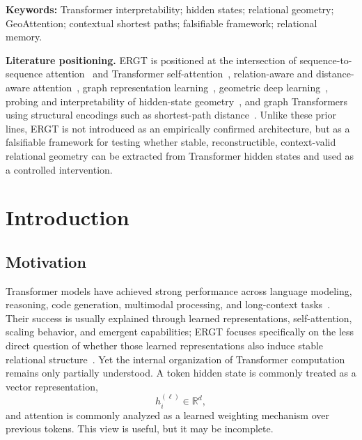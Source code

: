 \documentclass[11pt]{article}
\begin{document}
\noindent\textbf{Keywords:} Transformer interpretability; hidden states; relational geometry; GeoAttention; contextual shortest paths; falsifiable framework; relational memory.

\vspace{0.6em}
\noindent\textbf{Literature positioning.} ERGT is positioned at the intersection of sequence-to-sequence attention~\cite{bahdanau2015neural} and Transformer self-attention~\cite{vaswani2017attention}, relation-aware and distance-aware attention~\cite{shaw2018self,press2021train}, graph representation learning~\cite{scarselli2009graph,kipf2017semi,gilmer2017neural,velickovic2018graph}, geometric deep learning~\cite{bronstein2021geometric}, probing and interpretability of hidden-state geometry~\cite{hewitt2019structural,belinkov2019analysis}, and graph Transformers using structural encodings such as shortest-path distance~\cite{ying2021graphormer}. Unlike these prior lines, ERGT is not introduced as an empirically confirmed architecture, but as a falsifiable framework for testing whether stable, reconstructible, context-valid relational geometry can be extracted from Transformer hidden states and used as a controlled intervention.

\section{Introduction}

\subsection{Motivation}

Transformer models have achieved strong performance across language modeling, reasoning, code generation, multimodal processing, and long-context tasks~\cite{vaswani2017attention}. Their success is usually explained through learned representations, self-attention, scaling behavior, and emergent capabilities; ERGT focuses specifically on the less direct question of whether those learned representations also induce stable relational structure~\cite{hewitt2019structural,belinkov2019analysis}. Yet the internal organization of Transformer computation remains only partially understood. A token hidden state is commonly treated as a vector representation,
\[
h_i^{(\ell)}\in\mathbb{R}^d,
\]
and attention is commonly analyzed as a learned weighting mechanism over previous tokens. This view is useful, but it may be incomplete.
\end{document}
